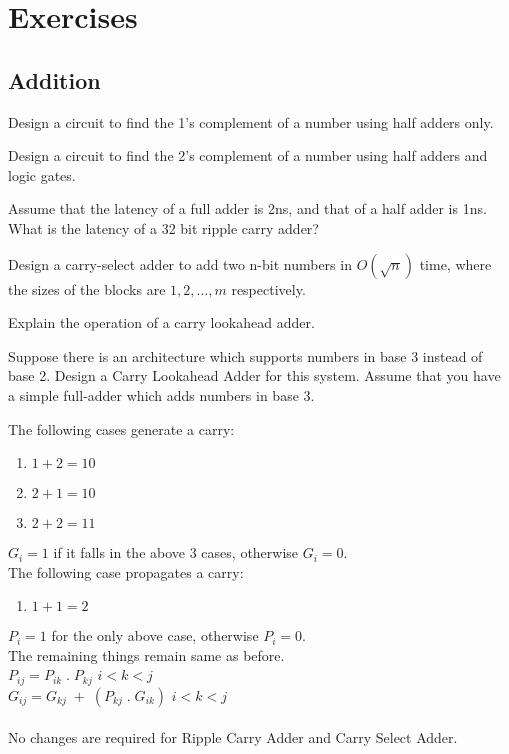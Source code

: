 \vskip 2cm

\section*{Exercises}
\vskip 1cm

\setcounter{Exercise}{0}
\setcounter{Answer}{0}

\subsection*{Addition}

\begin{ExerciseList}

\Exercise
Design a circuit to find the 1's complement of a number using half adders only. 

\Exercise
Design a circuit to find the 2's complement of a number using half adders and logic gates. 

\Exercise
Assume that the latency of a full adder is 2ns, and that of a half adder is 1ns. What is the latency
of a 32 bit ripple carry adder?

\Exercise[difficulty=1]
Design a carry-select adder to add two n-bit numbers in $O(\sqrt{n})$ time, where
the sizes of the blocks are $1, 2, ... ,m$ respectively.

\Exercise
Explain the operation of a carry lookahead adder.

\Exercise[difficulty=1]
Suppose there is an architecture which supports numbers in base 3 instead of base 2. Design a Carry Lookahead Adder for
this system. Assume that you have a simple full-adder which adds numbers in base 3. 

\Answer
The following cases generate a carry:


\begin{enumerate}
	\item $1+2 = 10$
	\item $2+1 = 10$
	\item $2+2 = 11$
\end{enumerate}

$G_i = 1$ if it falls in the above 3 cases, otherwise $G_i = 0$. \\
The following case propagates a carry:
 
\begin{enumerate}
	\item $1+1 = 2$
\end{enumerate}

$P_i = 1$ for the only above case, otherwise $P_i = 0$.\\
The remaining things remain same as before.\\
$P_{ij} = P_{ik}\; .\; P_{kj}$ \hspace{24 mm} $i<k<j$\\
$G_{ij} = G_{kj}\;+\;(P_{kj}\;.\;G_{ik})$\hspace{10 mm} $i<k<j$\\ \\
No changes are required for Ripple Carry Adder and Carry Select Adder.




\end{ExerciseList}
